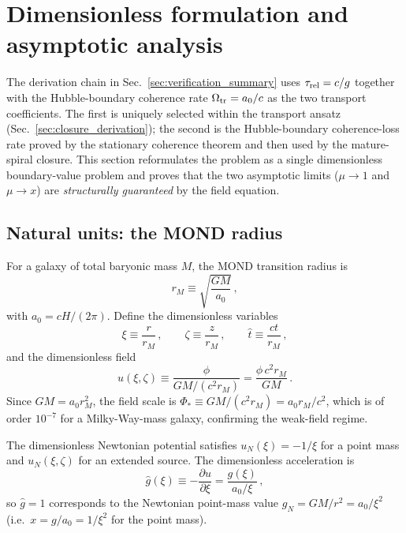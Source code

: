 \documentclass[11pt]{article}
\begin{document}
\section{Dimensionless formulation and asymptotic analysis}
\label{sec:dimless}

The derivation chain in Sec.~\ref{sec:verification_summary} uses
$\tau_{\rm rel}=c/g$ together with the Hubble-boundary coherence rate
$\Omega_{\rm tr}=a_0/c$ as the two transport coefficients.
The first is uniquely selected within the transport ansatz
(Sec.~\ref{sec:closure_derivation}); the second is the
Hubble-boundary coherence-loss rate proved by the stationary
coherence theorem and then used by the mature-spiral closure.
This section reformulates the problem as a single dimensionless
boundary-value problem and proves that the two asymptotic limits
($\mu\to1$ and $\mu\to x$) are \emph{structurally guaranteed}
by the field equation.

\subsection{Natural units: the MOND radius}
\label{sec:dimless_units}

For a galaxy of total baryonic mass $M$, the MOND transition radius is
\begin{equation}
r_M \equiv \sqrt{\frac{GM}{a_0}}\,,
\label{eq:rM}
\end{equation}
with $a_0 = cH/(2\pi)$.  Define the dimensionless variables
\begin{equation}
\xi \equiv \frac{r}{r_M}\,, \qquad
\zeta \equiv \frac{z}{r_M}\,, \qquad
\hat t \equiv \frac{ct}{r_M}\,,
\label{eq:dimless_coords}
\end{equation}
and the dimensionless field
\begin{equation}
u(\xi,\zeta) \equiv \frac{\phi}{GM/(c^{2}r_M)}
 = \frac{\phi\,c^{2}r_M}{GM}\,.
\label{eq:dimless_field}
\end{equation}
Since $GM = a_0 r_M^{2}$, the field scale is
$\Phi_* \equiv GM/(c^{2}r_M) = a_0 r_M / c^{2}$,
which is of order $10^{-7}$ for a Milky-Way-mass galaxy,
confirming the weak-field regime.

The dimensionless Newtonian potential satisfies
$u_N(\xi) = -1/\xi$ for a point mass and
$u_N(\xi,\zeta)$ for an extended source.
The dimensionless acceleration is
\begin{equation}
\hat g(\xi) \equiv -\frac{\partial u}{\partial \xi}
 = \frac{g(\xi)}{a_0/\xi}\,,
\label{eq:dimless_g}
\end{equation}
so $\hat g = 1$ corresponds to the Newtonian point-mass value
$g_N = GM/r^{2} = a_0/\xi^{2}$ (i.e.\ $x = g/a_0 = 1/\xi^{2}$ for
the point mass).
\end{document}

